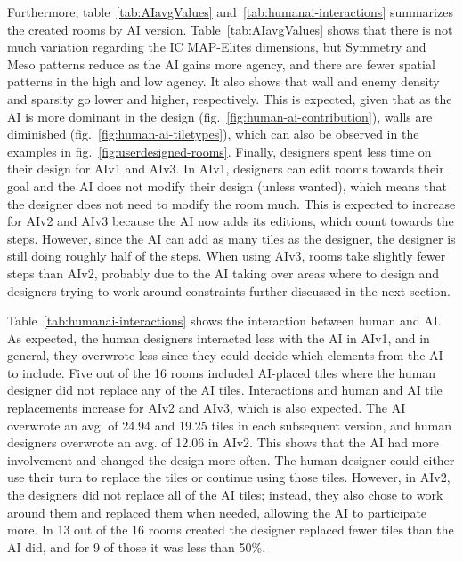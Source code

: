 
Furthermore, table~\ref{tab:AIavgValues} and~\ref{tab:humanai-interactions} summarizes the created rooms by AI version. Table~\ref{tab:AIavgValues} shows that there is not much variation regarding the IC MAP-Elites dimensions, but Symmetry and Meso patterns reduce as the AI gains more agency, and there are fewer spatial patterns in the high and low agency. It also shows that wall and enemy density and sparsity go lower and higher, respectively. This is expected, given that as the AI is more dominant in the design (fig.~\ref{fig:human-ai-contribution}), walls are diminished (fig.~\ref{fig:human-ai-tiletypes}), which can also be observed in the examples in fig.~\ref{fig:userdesigned-rooms}. Finally, designers spent less time on their design for AIv1 and AIv3. In AIv1,  designers can edit rooms towards their goal and the AI does not modify their design (unless wanted), which means that the designer does not need to modify the room much. This is expected to increase for AIv2 and AIv3 because the AI now adds its editions, which count towards the steps. However, since the AI can add as many tiles as the designer, the designer is still doing roughly half of the steps. When using AIv3, rooms take slightly fewer steps than AIv2, probably due to the AI taking over areas where to design and designers trying to work around constraints further discussed in the next section. 

Table~\ref{tab:humanai-interactions} shows the interaction between human and AI. As expected, the human designers interacted less with the AI in AIv1, and in general, they overwrote less since they could decide which elements from the AI to include. Five out of the 16 rooms included AI-placed tiles where the human designer did not replace any of the AI tiles. Interactions and human and AI tile replacements increase for AIv2 and AIv3, which is also expected. The AI overwrote an avg. of 24.94 and 19.25 tiles in each subsequent version, and human designers overwrote an avg. of 12.06 in AIv2. This shows that the AI had more involvement and changed the design more often. The human designer could either use their turn to replace the tiles or continue using those tiles. However, in AIv2, the designers did not replace all of the AI tiles; instead, they also chose to work around them and replaced them when needed, allowing the AI to participate more. In 13 out of the 16 rooms created the designer replaced fewer tiles than the AI did, and for 9 of those it was less than 50\%.

